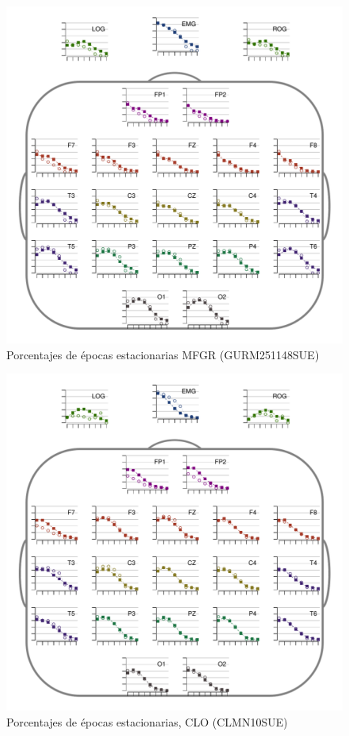 \begin{figure}
\centering
\includegraphics[width=.9\linewidth]{./img_resultados/GURM251148SUE_cabeza_epocas_.pdf}
\caption{Porcentajes de épocas estacionarias MFGR (GURM251148SUE)}
\end{figure}


\begin{figure}
\centering
\includegraphics[width=.9\linewidth]{./img_resultados/CLMN10SUE_cabeza_epocas_.pdf}
\caption{Porcentajes de épocas estacionarias, CLO (CLMN10SUE)}
\end{figure}

